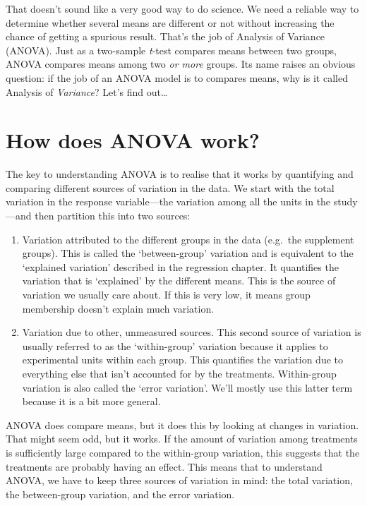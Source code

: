\documentclass[
]{book}
\begin{document}
That doesn't sound like a very good way to do science. We need a reliable way to determine whether several means are different or not without increasing the chance of getting a spurious result. That's the job of Analysis of Variance (ANOVA). Just as a two-sample \emph{t}-test compares means between two groups, ANOVA compares means among two \emph{or more} groups. Its name raises an obvious question: if the job of an ANOVA model is to compares means, why is it called Analysis of \emph{Variance}? Let's find out\ldots{}

\hypertarget{how-does-anova-work}{%
\section{How does ANOVA work?}\label{how-does-anova-work}}

The key to understanding ANOVA is to realise that it works by quantifying and comparing different sources of variation in the data. We start with the total variation in the response variable---the variation among all the units in the study---and then partition this into two sources:

\begin{enumerate}
\def\labelenumi{\arabic{enumi}.}
\item
  Variation attributed to the different groups in the data (e.g.~the supplement groups). This is called the `between-group' variation and is equivalent to the `explained variation' described in the regression chapter. It quantifies the variation that is `explained' by the different means. This is the source of variation we usually care about. If this is very low, it means group membership doesn't explain much variation.
\item
  Variation due to other, unmeasured sources. This second source of variation is usually referred to as the `within-group' variation because it applies to experimental units within each group. This quantifies the variation due to everything else that isn't accounted for by the treatments. Within-group variation is also called the `error variation'. We'll mostly use this latter term because it is a bit more general.
\end{enumerate}

ANOVA does compare means, but it does this by looking at changes in variation. That might seem odd, but it works. If the amount of variation among treatments is sufficiently large compared to the within-group variation, this suggests that the treatments are probably having an effect. This means that to understand ANOVA, we have to keep three sources of variation in mind: the total variation, the between-group variation, and the error variation.
\end{document}
